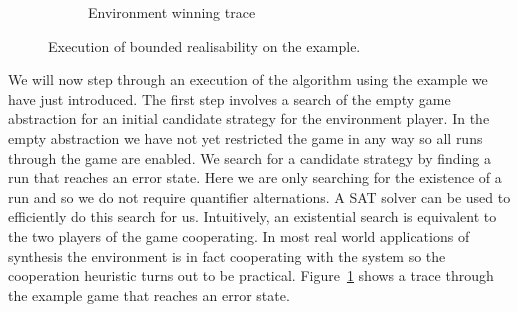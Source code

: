 \begin{figure}
    \centering
    \begin{subfigure}[t]{0.3\textwidth}
        \label{fig:example1a}
        \caption{Environment winning trace}
    \end{subfigure}%
    \begin{subfigure}[t]{\textwidth}
    \end{subfigure}
    \label{fig:example1}
    \caption{Execution of bounded realisability on the example.}
\end{figure}

We will now step through an execution of the algorithm using the example we have just introduced. The first step involves a search of the empty game abstraction for an initial candidate strategy for the environment player. In the empty abstraction we have not yet restricted the game in any way so all runs through the game are enabled. We search for a candidate strategy by finding a run that reaches an error state. Here we are only searching for the existence of a run and so we do not require quantifier alternations. A SAT solver can be used to efficiently do this search for us. Intuitively, an existential search is equivalent to the two players of the game cooperating. In most real world applications of synthesis the environment is in fact cooperating with the system so the cooperation heuristic turns out to be practical. Figure~\ref{fig:example1a} shows a trace through the example game that reaches an error state.

